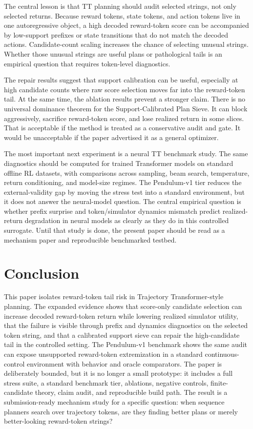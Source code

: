 \documentclass{article}
\newcommand{\method}{Support-Calibrated Plan Sieve}
\begin{document}
The central lesson is that TT planning should audit selected strings, not only selected returns. Because reward tokens, state tokens, and action tokens live in one autoregressive object, a high decoded reward-token score can be accompanied by low-support prefixes or state transitions that do not match the decoded actions. Candidate-count scaling increases the chance of selecting unusual strings. Whether those unusual strings are useful plans or pathological tails is an empirical question that requires token-level diagnostics.

The repair results suggest that support calibration can be useful, especially at high candidate counts where raw score selection moves far into the reward-token tail. At the same time, the ablation results prevent a stronger claim. There is no universal dominance theorem for the \method{}. It can block aggressively, sacrifice reward-token score, and lose realized return in some slices. That is acceptable if the method is treated as a conservative audit and gate. It would be unacceptable if the paper advertised it as a general optimizer.

The most important next experiment is a neural TT benchmark study. The same diagnostics should be computed for trained Transformer models on standard offline RL datasets, with comparisons across sampling, beam search, temperature, return conditioning, and model-size regimes. The Pendulum-v1 tier reduces the external-validity gap by moving the stress test into a standard environment, but it does not answer the neural-model question. The central empirical question is whether prefix surprise and token/simulator dynamics mismatch predict realized-return degradation in neural models as clearly as they do in this controlled surrogate. Until that study is done, the present paper should be read as a mechanism paper and reproducible benchmarked testbed.

\section{Conclusion}

This paper isolates reward-token tail risk in Trajectory Transformer-style planning. The expanded evidence shows that score-only candidate selection can increase decoded reward-token return while lowering realized simulator utility, that the failure is visible through prefix and dynamics diagnostics on the selected token string, and that a calibrated support sieve can repair the high-candidate tail in the controlled setting. The Pendulum-v1 benchmark shows the same audit can expose unsupported reward-token extremization in a standard continuous-control environment with behavior and oracle comparators. The paper is deliberately bounded, but it is no longer a small prototype: it includes a full stress suite, a standard benchmark tier, ablations, negative controls, finite-candidate theory, claim audit, and reproducible build path. The result is a submission-ready mechanism study for a specific question: when sequence planners search over trajectory tokens, are they finding better plans or merely better-looking reward-token strings?
\end{document}
